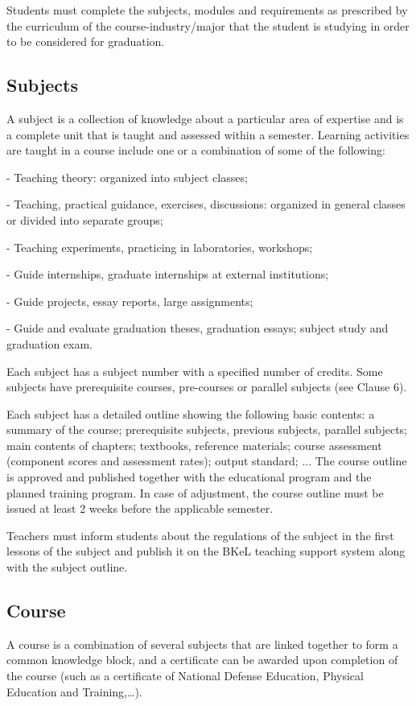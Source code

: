 Students must complete the subjects, modules and requirements as prescribed by the curriculum of the course-industry/major that the student is studying in order to be considered for graduation.

\subsection{Subjects}
A subject is a collection of knowledge about a particular area of expertise and is a complete unit that is taught and assessed within a semester. Learning activities are taught in a course include one or a combination of some of the following:

- Teaching theory: organized into subject classes;

- Teaching, practical guidance, exercises, discussions: organized in general classes or divided into separate groups;

- Teaching experiments, practicing in laboratories, workshops;

- Guide internships, graduate internships at external institutions;

- Guide projects, essay reports, large assignments;

- Guide and evaluate graduation theses, graduation essays; subject study and graduation exam.

Each subject has a subject number with a specified number of credits. Some subjects have prerequisite courses, pre-courses or parallel subjects (see Clause 6).

Each subject has a detailed outline showing the following basic contents: a summary of the course; prerequisite subjects, previous subjects, parallel subjects; main contents of chapters; textbooks, reference materials; course assessment (component scores and assessment rates); output standard; ... The course outline is approved and published together with the educational program and the planned training program. In case of adjustment, the course outline must be issued at least 2 weeks before the applicable semester.

Teachers must inform students about the regulations of the subject in the first lessons of the subject and publish it on the BKeL teaching support system along with the subject outline.

\subsection{Course}
A course is a combination of several subjects that are linked together to form a common knowledge block, and a certificate can be awarded upon completion of the course (such as a certificate of National Defense Education, Physical Education and Training,…).

